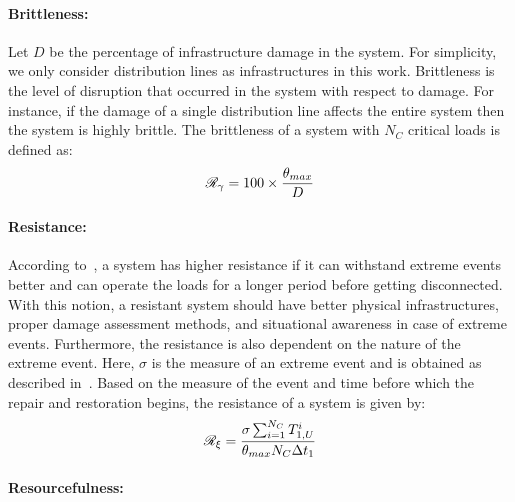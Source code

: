 \documentclass[hidelinks, 12pt]{article}
\begin{document}

\paragraph*{Brittleness:}

Let $D$ be the percentage of infrastructure damage in the system. For simplicity, we only consider distribution lines as infrastructures in this work. Brittleness is the level of disruption that occurred in the system with respect to damage. For instance, if the damage of a single distribution line affects the entire system then the system is highly brittle. The brittleness of a system with $N_C$ critical loads is defined as:
\vspace{-3pt}
\begin{equation} \small
    \mathcal{R}_\gamma = 100 \times \frac{\theta_{max}}{D}
    \label{eq:brittleness}
\end{equation}

\paragraph*{Resistance:}

According to~\cite{2016}, a system has higher resistance if it can withstand extreme events better and can operate the loads for a longer period before getting disconnected. With this notion, a resistant system should have better physical infrastructures, proper damage assessment methods, and situational awareness in case of extreme events. Furthermore, the resistance is also dependent on the nature of the extreme event. Here, $\sigma$ is the measure of an extreme event and is obtained as described in~\cite{2016}. Based on the measure of the event and time before which the repair and restoration begins, the resistance of a system is given by:
\vspace{-3pt}
\begin{equation} \small
    \mathcal{R}_\xi = \frac{\sigma \sum_{i=1}^{N_C} T_{1,U}^i}{\theta_{max} N_C \Delta t_1}
    \label{eq:resistance}
\end{equation}

\paragraph*{Resourcefulness:}
\end{document}

